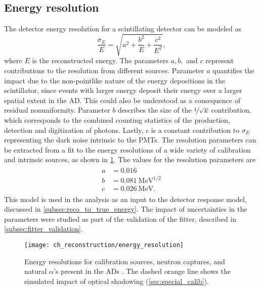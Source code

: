 \subsection{Energy resolution}
\label{subsec:resolution}

The detector energy resolution for a scintillating detector can be modeled as
\cite{energy_resolution}
\begin{equation}\label{eq:energy_resolution}
    \frac{\sigma_E}{E} = \sqrt{a^2 + \frac{b^2}{E} + \frac{c^2}{E^2}},
\end{equation}
where $E$ is the reconstructed energy.
The parameters $a,b,$ and $c$ represent contributions to the resolution
from different sources.
Parameter $a$ quantifies the impact due to the non-pointlike nature
of the energy depositions in the scintillator,
since events with larger energy deposit their energy over a larger spatial extent
in the AD.
This could also be understood as a consequence of residual nonuniformity.
Parameter $b$ describes the size of the $\nicefrac{1}{\sqrt{E}}$ contribution,
which corresponds to the combined counting statistics of
the production, detection and digitization of photons.
Lastly, $c$ is a constant contribution to $\sigma_E$
representing the dark noise intrinsic to the PMTs.
The resolution parameters can be extracted from a fit
to the energy resolutions of a wide variety of calibration and intrinsic sources,
as shown in \cref{fig:resolution}.
The values for the resolution parameters are \cite{ngd2016}
\begin{align}\label{eq:resolution_params}
    \begin{split}
        a &= 0.016 \\
        b &= \SI{0.081}{\MeV\tothe{1/2}} \\
        c &= \SI{0.026}{\MeV}.
    \end{split}
\end{align}
This model is used in the \thetaot{} analysis
as an input to the detector response model,
discussed in \cref{subsec:reco_to_true_energy}.
The impact of uncertainties in the parameters
were studied as part of the validation of the fitter,
described in \cref{subsec:fitter_validation}.

\begin{figure}
    \centering
    \texttt{[image: ch\_reconstruction/energy\_resolution]}
    \caption[Energy resolution]{Energy resolutions for calibration sources, neutron captures,
        and natural $\alpha$'s present in the ADs \cite{ngd2016}.
        The dashed orange line shows the simulated impact
        of optical shadowing (\cref{sec:special_calib}).
    }
    \label{fig:resolution}
\end{figure}


